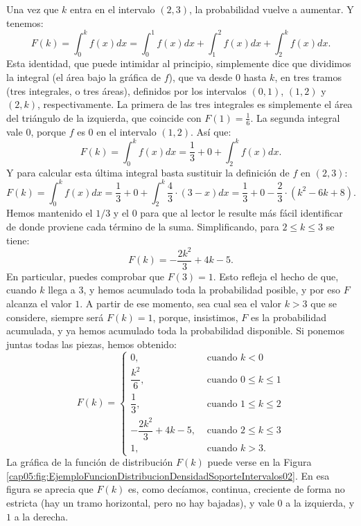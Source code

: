 \begin{ejemplo}
Una vez que $k$ entra en el intervalo $(2,3)$, la probabilidad vuelve a aumentar. Y tenemos:
\[F(k)=\int_0^k f(x)dx=\int_0^1 f(x)dx + \int_1^2 f(x)dx+ \int_2^k f(x)dx.\]
Esta identidad, que puede intimidar al principio, simplemente dice que dividimos la integral (el área bajo la gráfica de $f$), que va desde $0$ hasta $k$,  en tres tramos (tres integrales, o tres áreas), definidos por los intervalos $(0,1)$, $(1,2)$ y $(2,k)$, respectivamente. La primera de las tres integrales es simplemente el área del triángulo de la izquierda, que coincide con $F(1)=\frac{1}{6}$. La segunda integral vale $0$, porque $f$ es $0$ en el intervalo $(1,2)$. Así que:
\[F(k)=\int_0^k f(x)dx=\frac{1}{3} + 0 + \int_2^k f(x)dx.\]
Y para calcular esta última integral basta sustituir la definición de $f$ en $(2,3)$:
\[F(k)=\int_0^k f(x)dx=\frac{1}{3} + 0 + \int_2^k \dfrac{4}{3}\cdot(3-x)dx=
\frac{1}{3} +0-\frac{2}{3}\cdot(k^2-6 k+8).\]
Hemos mantenido el $1/3$ y el $0$ para que al lector le resulte más fácil identificar de donde proviene cada término de la suma. Simplificando, para $2\leq k\leq 3$ se tiene:
\[F(k)=-\dfrac{2 k^2}{3}+4 k-5.\]
En particular, puedes comprobar que $F(3)=1$. Esto refleja el hecho de que, cuando $k$ llega a $3$,
y hemos acumulado toda la probabilidad posible, y por eso $F$ alcanza el valor $1$. A partir de ese
momento, sea cual sea el valor $k>3$ que se considere, siempre será $F(k)=1$, porque, insistimos,
$F$ es la probabilidad acumulada, y ya hemos acumulado toda la probabilidad disponible. Si ponemos
juntas todas las piezas, hemos obtenido:
\[F(k)=
\begin{cases}
0,&\mbox{ cuando } k<0\\[3mm]
\dfrac{k^2}{6},&\mbox{ cuando }0\leq k\leq 1\\[3mm]
\dfrac{1}{3},&\mbox{ cuando }1\leq k\leq 2\\[3mm]
-\dfrac{2 k^2}{3}+4 k-5,&\mbox{ cuando }2\leq k\leq 3\\[3mm]
1,&\mbox{ cuando }k>3.
\end{cases}\]
La gráfica de la función de distribución $F(k)$ puede verse en la Figura
\ref{cap05:fig:EjemploFuncionDistribucionDensidadSoporteIntervalos02}. En esa figura se aprecia que
$F(k)$ es, como decíamos, continua, creciente de forma no estricta (hay un tramo horizontal, pero
no hay bajadas), y vale $0$ a la izquierda, y $1$ a la derecha.


\end{ejemplo}
